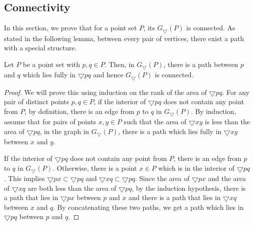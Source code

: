  \subsection{Connectivity}
In this section, we prove that for a point set $P$, its $G_\bigtriangledown(P)$ is connected. As stated in the following lemma, between every pair 
of vertices, there exist a path with a special structure.  
\begin{lemma}\label{pathintriangle}
 Let $P$ be a point set with $p, q \in P$. Then, in $G_\bigtriangledown(P)$, there 
is a path between $p$ and $q$ which lies fully in $\bigtriangledown pq$ and hence $G_\bigtriangledown(P)$ is connected. 
\end{lemma}
\begin{proof}
 We will prove this using induction on the rank of the area of $\bigtriangledown pq$. For any pair of distinct points $p, q \in P$, if the interior 
of $\bigtriangledown pq$ does not contain any point from $P$, by definition, there is an edge from $p$ to $q$ in $G_\bigtriangledown(P)$. 
By induction, assume that for  pairs of points $x, y \in P$ such that the area of $\bigtriangledown xy$ is less than the area of $\bigtriangledown pq$, 
in the graph in $G_\bigtriangledown(P)$, there is a path  which lies fully in $\bigtriangledown xy$ between $x$ and $y$.

If the interior of $\bigtriangledown pq$ does not contain any point from $P$, there is an edge from $p$ to $q$ in $G_\bigtriangledown(P)$. Otherwise, 
there is a point $x \in P$ which is in the interior of $\bigtriangledown pq$. This implies $\bigtriangledown px \subset \bigtriangledown pq$ and 
$\bigtriangledown xq \subset \bigtriangledown pq$. Since the area of $\bigtriangledown px$ and the area of $\bigtriangledown xq$ are both less than 
the area of $\bigtriangledown pq$, by the induction hypothesis, there is a path that lies in $\bigtriangledown px$ between $p$ and $x$ and there is 
a path that lies in $\bigtriangledown xq$ between $x$ and $q$. By concatenating these two paths, we get a path which lies in $\bigtriangledown pq$ 
between $p$ and $q$.  
\end{proof}
